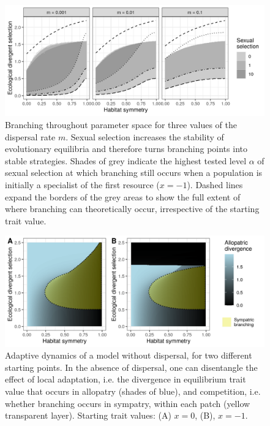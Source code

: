 
\begin{figure}
    \centering
    \includegraphics[width=\textwidth]{figures/map_branching_points}
    \caption{Branching throughout parameter space for three values of the dispersal rate $m$. Sexual selection increases the stability of evolutionary equilibria and therefore turns branching points into stable strategies. Shades of grey indicate the highest tested level $\alpha$ of sexual selection at which branching still occurs when a population is initially a specialist of the first resource ($x = -1$). Dashed lines expand the borders of the grey areas to show the full extent of where branching can theoretically occur, irrespective of the starting trait value.}
    \label{fig:map_branching_points}
\end{figure}

\begin{figure}
    \centering
    \includegraphics[width=\textwidth]{figures/divergence_across_patches}
    \caption{Adaptive dynamics of a model without dispersal, for two different starting points. In the absence of dispersal, one can disentangle the effect of local adaptation, i.e. the divergence in equilibrium trait value that occurs in allopatry (shades of blue), and competition, i.e. whether branching occurs in sympatry, within each patch (yellow transparent layer). Starting trait values: (A) $x = 0$, (B), $x = -1$.}
    \label{fig:map_divergence}
\end{figure}